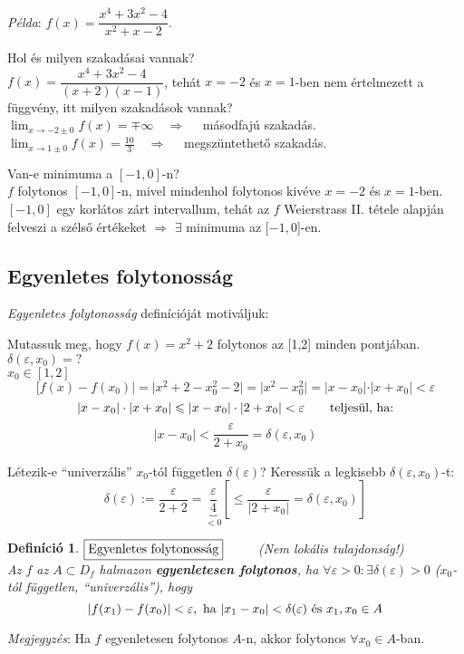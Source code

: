 \documentclass[a4paper,12pt,twoside]{book}
\newtheorem{defi}{Definíció}[chapter]
\theoremstyle{break}
\theoremstyle{plain}
\begin{document}
\emph{Példa}: $f(x) = \dfrac{x^4+3x^2-4}{x^2+x-2}$.
\begin{enumerate*}
 \renewcommand{\theenumi}{\alph{enumi}}

 \item Hol és milyen szakadásai vannak?\\
  $f(x) = \dfrac{x^4+3x^2-4}{(x+2)(x-1)}$, tehát $x=-2$ és $x=1$-ben nem értelmezett a függvény, itt milyen szakadások vannak?\\
  $\displaystyle \lim_{x\to-2\pm 0} f(x) = \mp \infty \quad \Rightarrow \quad$ másodfajú szakadás.\\
  $\displaystyle \lim_{x\to1\pm 0} f(x) = \frac{10}{3} \quad \Rightarrow \quad$ megszüntethető szakadás.\\

 \item Van-e minimuma a $[-1, 0]$-n?\\
  $f$ folytonos $[-1, 0]$-n, mivel mindenhol folytonos kivéve $x=-2$ és $x=1$-ben. $[-1, 0]$ egy korlátos zárt intervallum, tehát az $f$ Weierstrass II. tétele alapján felveszi a szélső értékeket $\Rightarrow$ $\exists$ minimuma az $[-1, 0$]-en.
\end{enumerate*}

\subsection{Egyenletes folytonosság}

\emph{Egyenletes folytonosság} definícióját motiváljuk:
\begin{enumerate*}
\item Mutassuk meg, hogy $f(x)=x^2+2$ folytonos az [1,2] minden pontjában. $\delta(\varepsilon, x_0) = ?$\\
  $x_0 \in [1,2]$
  \[[f(x)-f(x_0)| = |x^2+2-x_0^2-2|= |x^2-x_0^2| = |x-x_0|\cdot|x+x_0| < \varepsilon\]
  \[|x-x_0|\cdot|x+x_0| \leqslant |x-x_0|\cdot|2+x_0| < \varepsilon \qquad \hbox{teljesül, ha:}\]
  \[|x-x_0| < \frac{\varepsilon}{2+x_0} = \delta(\varepsilon, x_0)\]
\item Létezik-e ``univerzális'' $x_0$-tól független $\delta(\varepsilon)$?
  Keressük a legkisebb $\delta(\varepsilon, x_0)$-t:
  \[\delta(\varepsilon) := \frac{\varepsilon}{2+2} = \underbrace{\frac{\varepsilon}{4}}_{< 0} \left[ \leqslant \frac{\varepsilon}{|2+x_0|} = \delta(\varepsilon, x_0) \right]\]
\end{enumerate*}

\begin{defi} $\boxed{$Egyenletes folytonosság$}$ $\qquad$ (Nem lokális tulajdonság!)\\
 Az $f$ az $A\subset D_f$ halmazon \textbf{egyenletesen folytonos}, ha $\forall \varepsilon>0 : \exists \delta(\varepsilon)>0$ ($x_0$-tól független, ``univerzális''), hogy
 \[|f(x_1)-f(x_0)|<\varepsilon, \hbox{ ha } |x_1-x_0|<\delta(\varepsilon) \hbox{ és } x_1,x_0\in A\]
\end{defi}
\emph{Megjegyzés}: Ha $f$ egyenletesen folytonos $A$-n, akkor folytonos $\forall x_0\in A$-ban.\\
\end{document}

